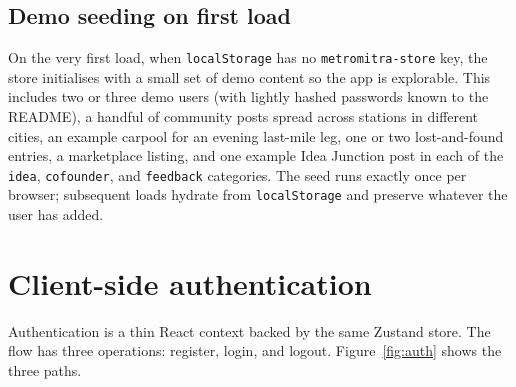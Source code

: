 \documentclass[a4paper,11pt]{article}
\begin{document}
\subsection{Demo seeding on first load}

On the very first load, when \texttt{localStorage} has no
\texttt{metromitra-store} key, the store initialises with a small set of demo
content so the app is explorable. This includes two or three demo users (with
lightly hashed passwords known to the README), a handful of community posts
spread across stations in different cities, an example carpool for an evening
last-mile leg, one or two lost-and-found entries, a marketplace listing, and
one example Idea Junction post in each of the \texttt{idea},
\texttt{cofounder}, and \texttt{feedback} categories. The seed runs exactly
once per browser; subsequent loads hydrate from \texttt{localStorage} and
preserve whatever the user has added.


\section{Client-side authentication}
\label{sec:auth}

Authentication is a thin React context backed by the same Zustand store. The
flow has three operations: register, login, and logout. Figure~\ref{fig:auth}
shows the three paths.
\end{document}

